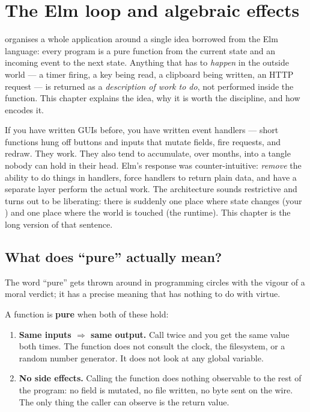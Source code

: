 \chapter{The Elm loop and algebraic effects}
\label{ch:elm}

\maya{} organises a whole application around a single idea borrowed from
the Elm language: every program is a pure function from the current
state and an incoming event to the next state. Anything that has to
\emph{happen} in the outside world --- a timer firing, a key being
read, a clipboard being written, an HTTP request --- is returned as a
\emph{description of work to do}, not performed inside the function.
This chapter explains the idea, why it is worth the discipline, and
how \maya{} encodes it.

\begin{aside}
If you have written GUIs before, you have written event handlers ---
short functions hung off buttons and inputs that mutate fields, fire
requests, and redraw. They work. They also tend to accumulate, over
months, into a tangle nobody can hold in their head. Elm's response
was counter-intuitive: \emph{remove} the ability to do things in
handlers, force handlers to return plain data, and have a separate
layer perform the actual work. The architecture sounds restrictive
and turns out to be liberating: there is suddenly one place where
state changes (your ) and one place where the world is
touched (the runtime). This chapter is the long version of that
sentence.
\end{aside}

\section{What does ``pure'' actually mean?}
\label{sec:elm:purity}

The word ``pure'' gets thrown around in programming circles with the
vigour of a moral verdict; it has a precise meaning that has nothing
to do with virtue.

A function is \textbf{pure} when both of these hold:

\begin{enumerate}[leftmargin=*]
  \item \textbf{Same inputs $\Rightarrow$ same output.} Call
     twice and you get the same value both times. The
    function does not consult the clock, the filesystem, or a random
    number generator. It does not look at any global variable.
  \item \textbf{No side effects.} Calling the function does nothing
    observable to the rest of the program: no field is mutated, no
    file written, no byte sent on the wire. The only thing the
    caller can observe is the return value.
\end{enumerate}

